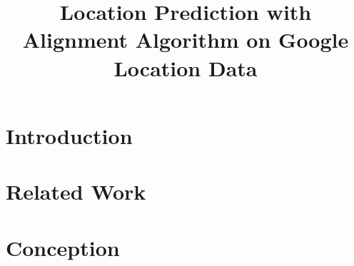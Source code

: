 \documentclass[conference]{IEEEtran}
\begin{document}
\title{Location Prediction with Alignment Algorithm on Google Location Data}

\author{
}
	

\maketitle

\begin{abstract}

\end{abstract}

\IEEEpeerreviewmaketitle

\section{Introduction}\label{section:introduction}






\section{Related Work}\label{section:relatedWork}
\cite{craig2017region}



\section{Conception}\label{section:conception}
\end{document}
